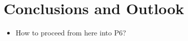 \chapter{Conclusions and Outlook}
\label{ch:conclusions}

\begin{itemize}\tightlist
    \item
        How to proceed from here into P6?
\end{itemize}
